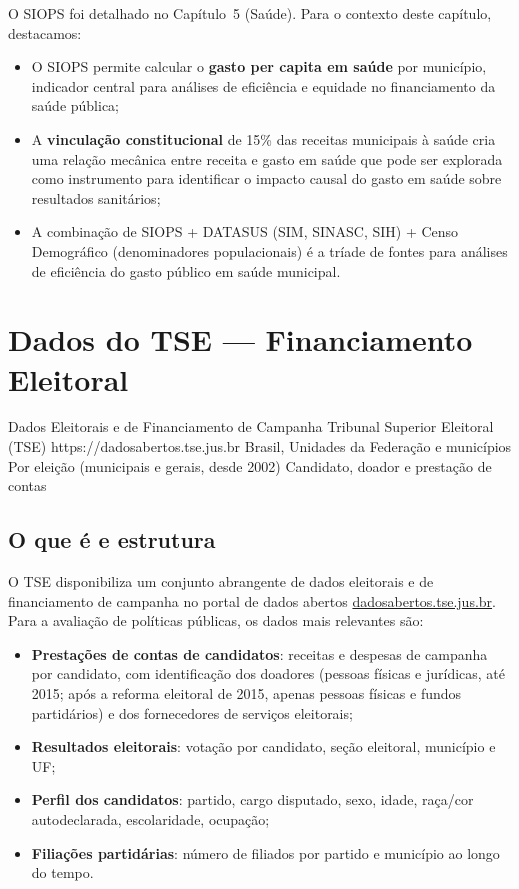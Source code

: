 O SIOPS foi detalhado no Capítulo~5 (Saúde). Para o contexto deste capítulo, destacamos:

\begin{itemize}
  \item O SIOPS permite calcular o \textbf{gasto per capita em saúde} por município, indicador central para análises de eficiência e equidade no financiamento da saúde pública;
  \item A \textbf{vinculação constitucional} de 15\% das receitas municipais à saúde cria uma relação mecânica entre receita e gasto em saúde que pode ser explorada como instrumento para identificar o impacto causal do gasto em saúde sobre resultados sanitários;
  \item A combinação de SIOPS + DATASUS (SIM, SINASC, SIH) + Censo Demográfico (denominadores populacionais) é a tríade de fontes para análises de eficiência do gasto público em saúde municipal.
\end{itemize}

\section{Dados do TSE --- Financiamento Eleitoral}

\ficharapida
  {Dados Eleitorais e de Financiamento de Campanha}
  {Tribunal Superior Eleitoral (TSE)}
  {https://dadosabertos.tse.jus.br}
  {Brasil, Unidades da Federação e municípios}
  {Por eleição (municipais e gerais, desde 2002)}
  {Candidato, doador e prestação de contas}

\subsection{O que é e estrutura}

O TSE disponibiliza um conjunto abrangente de dados eleitorais e de financiamento de campanha no portal de dados abertos \url{dadosabertos.tse.jus.br}. Para a avaliação de políticas públicas, os dados mais relevantes são:

\begin{itemize}
  \item \textbf{Prestações de contas de candidatos}: receitas e despesas de campanha por candidato, com identificação dos doadores (pessoas físicas e jurídicas, até 2015; após a reforma eleitoral de 2015, apenas pessoas físicas e fundos partidários) e dos fornecedores de serviços eleitorais;
  \item \textbf{Resultados eleitorais}: votação por candidato, seção eleitoral, município e UF;
  \item \textbf{Perfil dos candidatos}: partido, cargo disputado, sexo, idade, raça/cor autodeclarada, escolaridade, ocupação;
  \item \textbf{Filiações partidárias}: número de filiados por partido e município ao longo do tempo.
\end{itemize}

